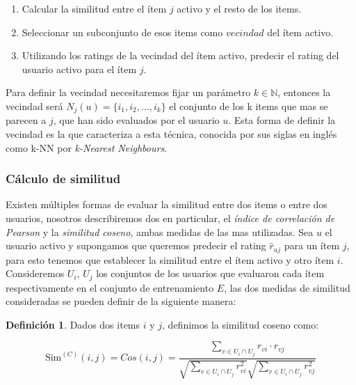 \documentclass[hidelinks,12pt,a4paper]{book}
\theoremstyle{plain}
\theoremstyle{definition}
\newtheorem{definicion}[theorem]{Definición} %
\begin{document}
\begin{enumerate}
\item Calcular la similitud entre el ítem $j$ activo y el resto de los items.
\item Seleccionar un subconjunto de esos items como $vecindad$ del ítem activo.
\item Utilizando los ratings de la vecindad del ítem activo, predecir el rating del usuario activo para el ítem $j$.
\end{enumerate}

Para definir la vecindad necesitaremos fijar un parámetro $k\in \mathbb{N}$, entonces la vecindad será $N_j(u)=\{i_1,i_2,\dots,i_k\}$ el conjunto de los k items que mas se parecen a $j$, que han sido evaluados por el usuario $u$. Esta forma de definir la vecindad es la que caracteriza a esta técnica, conocida por sus siglas en inglés como k-NN por \textit{k-Nearest Neighbours}.


\subsubsection{Cálculo de similitud}
Existen múltiples formas de evaluar la similitud entre dos items o entre dos usuarios\cite{cacheda2011comparison}\cite{neighbordsurvey}, nosotros describiremos dos en particular, el \textit{índice de correlación de Pearson} y la \textit{similitud coseno}, ambas medidas de las mas utilizadas\cite{agg}\cite{herlocker1999algorithmic}\cite{sarwar2001item}. Sea $u$ el usuario activo y supongamos que queremos predecir el rating $\hat{r}_{uj}$ para un ítem $j$, para esto tenemos que establecer la similitud entre el ítem activo y otro ítem $i$. Consideremos $U_i$, $U_j$ los conjuntos de los usuarios que evaluaron cada ítem respectivamente en el conjunto de entrenamiento $E$, las dos medidas de similitud consideradas se pueden definir de la siguiente manera:

\begin{definicion}
Dados dos items $i$ y $j$, definimos la similitud coseno como:

\begin{equation}
\text{Sim}^{(C)}(i,j)= Cos(i,j) = \frac{\sum_{v \in {U_i\cap U_j}} r_{vi} \cdot r_{vj}}{{\sqrt{\sum_{v \in {U_i\cap U_j}} r_{vi}^2}}{\sqrt{\sum_{v \in {U_i\cap U_j}} r_{vj}^2}}}
\end{equation}
\end{definicion}
\end{document}
